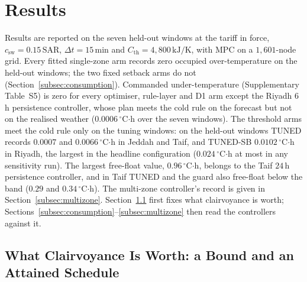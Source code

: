 \documentclass[pdflatex,sn-mathphys-num,iicol]{sn-jnl}
\theoremstyle{thmstyleone}\newtheorem{proposition}{Proposition}\newtheorem{corollary}{Corollary}
\theoremstyle{thmstyletwo}\newtheorem{remark}{Remark}\newtheorem{observation}{Observation}
\theoremstyle{thmstylethree}\newtheorem{definition}{Definition}
\newcommand{\Cth}{C_{\mathrm{th}}}
\newcommand{\csw}{c_{\mathrm{sw}}}
\newcommand{\SAR}{\text{SAR}}
\begin{document}
\section{Results}
\label{sec:results}

Results are reported on the seven held-out windows at the tariff in force, $\csw=0.15\,\SAR$, $\Delta t=15\,$min and $\Cth=4{,}800\,\text{kJ/K}$, with MPC on a $1{,}601$-node grid. Every fitted single-zone arm records zero occupied over-temperature on the held-out windows; the two fixed setback arms do not (Section~\ref{subsec:consumption}). Commanded under-temperature (Supplementary Table~S5) is zero for every optimiser, rule-layer and D1 arm except the Riyadh $6\,$h persistence controller, whose plan meets the cold rule on the forecast but not on the realised weather ($0.0006\,^\circ$C$\cdot$h over the seven windows). The threshold arms meet the cold rule only on the tuning windows: on the held-out windows TUNED records $0.0007$ and $0.0066\,^\circ$C$\cdot$h in Jeddah and Taif, and TUNED-SB $0.0102\,^\circ$C$\cdot$h in Riyadh, the largest in the headline configuration ($0.024\,^\circ$C$\cdot$h at most in any sensitivity run). The largest free-float value, $0.96\,^\circ$C$\cdot$h, belongs to the Taif $24\,$h persistence controller, and in Taif TUNED and the guard also free-float below the band ($0.29$ and $0.34\,^\circ$C$\cdot$h). The multi-zone controller's record is given in Section~\ref{subsec:multizone}. Section~\ref{subsec:bound} first fixes what clairvoyance is worth; Sections~\ref{subsec:consumption}--\ref{subsec:multizone} then read the controllers against it.
 
\subsection{What Clairvoyance Is Worth: a Bound and an Attained Schedule}
\label{subsec:bound}
\end{document}
